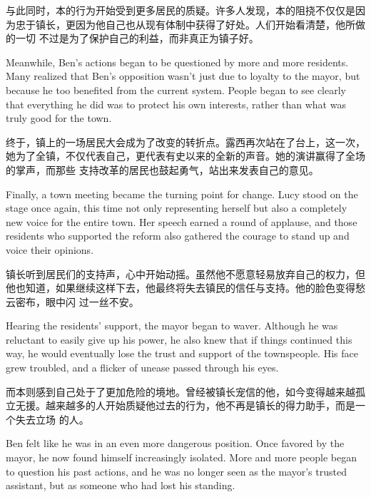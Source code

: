 与此同时，本的行为开始受到更多居民的质疑。许多人发现，本的阻挠不仅仅是因为忠于镇长，更因为他自己也从现有体制中获得了好处。人们开始看清楚，他所做的一切
不过是为了保护自己的利益，而非真正为镇子好。

\begin{flushright} Meanwhile, Ben’s actions began to be questioned by more
    and more residents. Many realized that Ben’s opposition wasn’t just due to
    loyalty to the mayor, but because he too benefited from the current system.
    People began to see clearly that everything he did was to protect his own
    interests, rather than what was truly good for the town. \end{flushright}

终于，镇上的一场居民大会成为了改变的转折点。露西再次站在了台上，这一次，她为了全镇，不仅代表自己，更代表有史以来的全新的声音。她的演讲赢得了全场的掌声，而那些
支持改革的居民也鼓起勇气，站出来发表自己的意见。

\begin{flushright}
    Finally, a town meeting became the turning point for change. Lucy stood on
    the stage once again, this time not only representing herself but also a
    completely new voice for the entire town. Her speech earned a round of
    applause, and those residents who supported the reform also gathered the
    courage to stand up and voice their opinions.
\end{flushright}

镇长听到居民们的支持声，心中开始动摇。虽然他不愿意轻易放弃自己的权力，但他也知道，如果继续这样下去，他最终将失去镇民的信任与支持。他的脸色变得愁云密布，眼中闪
过一丝不安。

\begin{flushright} Hearing the residents' support, the mayor began to
    waver. Although he was reluctant to easily give up his power, he also knew
    that
    if things continued this way, he would eventually lose the trust and
    support of
    the townspeople. His face grew troubled, and a flicker of unease passed
    through
    his eyes. \end{flushright}

而本则感到自己处于了更加危险的境地。曾经被镇长宠信的他，如今变得越来越孤立无援。越来越多的人开始质疑他过去的行为，他不再是镇长的得力助手，而是一个失去立场
的人。

\begin{flushright} Ben felt like he was in an even more dangerous position.
    Once favored by the mayor, he now found himself increasingly isolated. More
    and
    more people began to question his past actions, and he was no longer seen
    as
    the mayor’s trusted assistant, but as someone who had lost his standing.
\end{flushright}

